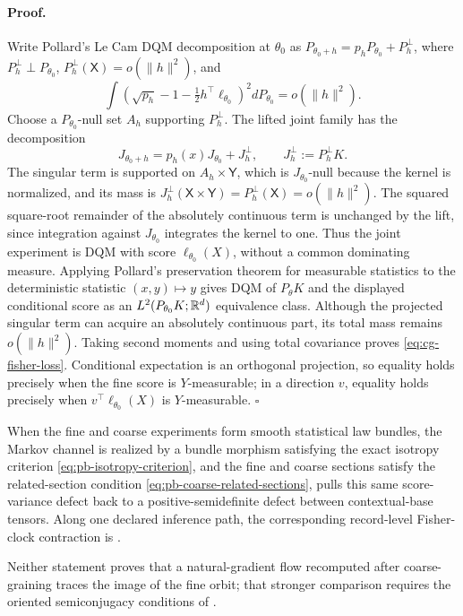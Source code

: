 \paragraph{Proof.}
Write Pollard's Le Cam DQM decomposition at \(\theta_0\) as
\(P_{\theta_0+h}=p_hP_{\theta_0}+P_h^\perp\), where
\(P_h^\perp\perp P_{\theta_0}\),
\(P_h^\perp(\mathsf X)=o(\lVert h\rVert^2)\), and
\[
\int\left(\sqrt{p_h}-1-\tfrac12h^\top\ell_{\theta_0}\right)^2
dP_{\theta_0}=o(\lVert h\rVert^2).
\]
Choose a \(P_{\theta_0}\)-null set \(A_h\) supporting \(P_h^\perp\). The
lifted joint family has the decomposition
\[
J_{\theta_0+h}=p_h(x)J_{\theta_0}+J_h^\perp,
\qquad J_h^\perp:=P_h^\perp K.
\]
The singular term is supported on \(A_h\times\mathsf Y\), which is
\(J_{\theta_0}\)-null because the kernel is normalized, and its mass is
\(J_h^\perp(\mathsf X\times\mathsf Y)=P_h^\perp(\mathsf X)
=o(\lVert h\rVert^2)\). The squared square-root remainder of the absolutely
continuous term is unchanged by the lift, since integration against
\(J_{\theta_0}\) integrates the kernel to one. Thus the joint experiment is
DQM with score \(\ell_{\theta_0}(X)\), without a common dominating measure.
Applying Pollard's preservation theorem for measurable statistics
\citep{Pollard2013} to the deterministic statistic \((x,y)\mapsto y\)
gives DQM of \(P_\theta K\) and the displayed conditional score as an
\(L^2(P_{\theta_0}K;\mathbb R^d)\) equivalence class. Although the projected singular
term can acquire an absolutely continuous part, its total mass remains
\(o(\lVert h\rVert^2)\). Taking second moments and using total covariance
proves \eqref{eq:cg-fisher-loss}.
Conditional expectation is an orthogonal projection, so equality holds
precisely when the fine score is \(Y\)-measurable; in a direction \(v\), equality
holds precisely when \(v^\top\ell_{\theta_0}(X)\) is \(Y\)-measurable. \(\square\)

When the fine and coarse experiments form smooth statistical law bundles, the
Markov channel is realized by a bundle morphism satisfying the exact isotropy
criterion \eqref{eq:pb-isotropy-criterion}, and the fine and coarse sections
satisfy the related-section condition
\eqref{eq:pb-coarse-related-sections},
 pulls this same score-variance defect
back to a positive-semidefinite defect between contextual-base tensors.  Along
one declared inference path, the corresponding record-level Fisher-clock
contraction is .

Neither statement proves that a natural-gradient flow recomputed after
coarse-graining traces the image of the fine orbit; that stronger comparison
requires the oriented semiconjugacy conditions of
.

